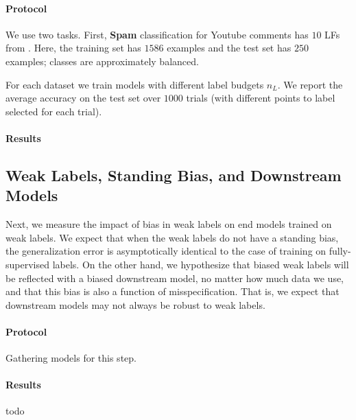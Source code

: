 \paragraph{Protocol}
We use two tasks. First, \textbf{Spam} classification for Youtube comments  \cite{alberto2015tubespam} has $10$ LFs from \cite{Ratner19}. Here, the training set has $1586$ examples and the test set has $250$ examples; classes are approximately balanced. 

For each dataset we train models with different label budgets $n_L$. We report the average accuracy on the test set over $1000$ trials (with different points to label selected for each trial). 

\paragraph{Results}

\subsection{Weak Labels, Standing Bias, and Downstream Models}
Next, we measure the impact of bias in weak labels on end models trained on weak labels. We expect that when the weak labels do not have a standing bias, the generalization error is asymptotically identical to the case of training on fully-supervised labels. On the other hand, we hypothesize that biased weak labels will be reflected with a biased downstream model, no matter how much data we use, and that this bias is also a function of misspecification. That is, we expect that downstream models may not always be robust to weak labels.

\paragraph{Protocol}
{\color{red} Gathering models for this step.}

\paragraph{Results}
{\color{red} todo}

